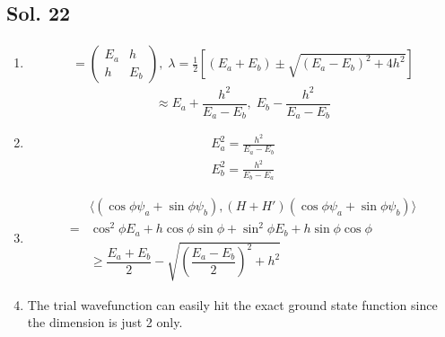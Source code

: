 \subsection*{Sol. 22}
\begin{enumerate}
    \item 
    \begin{align*}
        [H+H']
        =
        \begin{pmatrix}
        E_a & h\\
        h & E_b
        \end{pmatrix},\;
        \lambda = 
        \frac{1}{2}
        \left[
        (E_a + E_b)
        \pm 
        \sqrt{(E_a-E_b)^2 + 4h^2}
        \right]
    \end{align*}
    $$
    \approx E_a + \frac{h^2}{E_a-E_b},\;
    E_b - \frac{h^2}{E_a-E_b}
    $$
    \item 
    \begin{align*}
        E_a^2 = \frac{h^2}{E_a-E_b}
    \end{align*}
    \begin{align*}
        E_b^2 = \frac{h^2}{E_b-E_a}
    \end{align*}
    \item 
    \begin{align*}
        &\langle(\cos\phi\psi_a+\sin\phi\psi_b), (H+H')(\cos\phi\psi_a+\sin\phi\psi_b)\rangle\\
        =&
        \cos^2\phi E_a + h\cos\phi \sin\phi
        +\sin^2\phi E_b + h \sin\phi\cos\phi\\
        &\geq \dfrac{E_a+E_b}{2}-\sqrt{\left(\dfrac{E_a-E_b}{2}\right)^2+h^2}
    \end{align*}
    \item The trial wavefunction can easily hit the exact ground state function since the dimension is just 2 only.
\end{enumerate}

